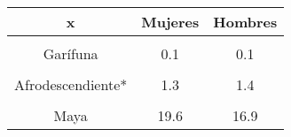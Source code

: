 \begin{description}
\begin{table}
	\centering
	\begin{tabular}{c>{}cc}
		\toprule
		\textbf{x} & \textbf{Mujeres} & \textbf{Hombres}\\
		\midrule
		\cellcolor[HTML]{B6B3FF}{Xinka} & \cellcolor[HTML]{B6B3FF}{0.7} & \cellcolor[HTML]{B6B3FF}{0.6}\\
		Garífuna & 0.1 & 0.1\\
		\cellcolor[HTML]{B6B3FF}{Ladino} & \cellcolor[HTML]{B6B3FF}{31.2} & \cellcolor[HTML]{B6B3FF}{27.8}\\
		Afrodescendiente* & 1.3 & 1.4\\
		\cellcolor[HTML]{B6B3FF}{Extranjero} & \cellcolor[HTML]{B6B3FF}{0.1} & \cellcolor[HTML]{B6B3FF}{0.2}\\
		Maya & 19.6 & 16.9\\
		\bottomrule
	\end{tabular}
\end{table}
\end{description}